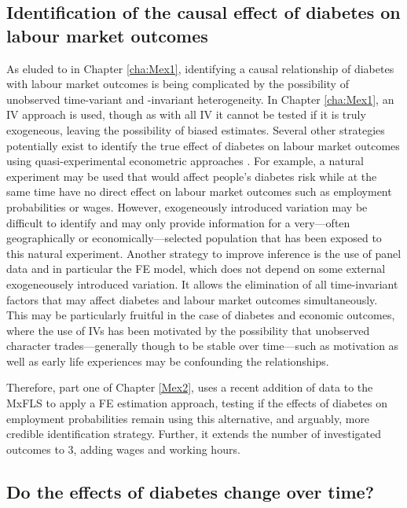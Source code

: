 \subsection{Identification of the causal effect of diabetes on labour market outcomes}

As eluded to in Chapter \ref{cha:Mex1}, identifying a causal relationship of diabetes with labour market outcomes is being complicated by the possibility of unobserved time-variant and -invariant heterogeneity. In Chapter \ref{cha:Mex1}, an \ac{IV} approach is used, though as with all \ac{IV} it cannot be tested if it is truly exogeneous, leaving the possibility of biased estimates. Several other strategies potentially exist to identify the true effect of diabetes on labour market outcomes using quasi-experimental econometric approaches \parencite{Antonakis2012}. For example, a natural experiment may be used that would affect people's diabetes risk while at the same time have no direct effect on labour market outcomes such as employment probabilities or wages. However, exogeneously introduced variation may be difficult to identify and may only provide information for a very---often geographically or economically---selected population that has been exposed to this natural experiment. Another strategy to improve inference is the use of panel data and in particular the \ac{FE} model, which does not depend on some external exogeneousely introduced variation. It allows the elimination of all time-invariant factors that may affect diabetes and labour market outcomes simultaneously. This may be particularly fruitful in the case of diabetes and economic outcomes, where the use of \ac{IV}s has been motivated by the possibility that unobserved character trades---generally though to be stable over time---such as motivation as well as early life experiences may be confounding the relationships.

Therefore, part one of Chapter \ref{Mex2}, uses a recent addition of data to the \ac{MxFLS} to apply a \ac{FE} estimation approach, testing if the effects of diabetes on employment probabilities remain using this alternative, and arguably, more credible identification strategy. Further, it extends the number of investigated outcomes to 3, adding wages and working hours.

\subsection{Do the effects of diabetes change over time?}

